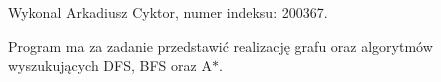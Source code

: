 \-Wykonal \-Arkadiusz \-Cyktor, numer indeksu\-: 200367.

\-Program ma za zadanie przedstawić realizację grafu oraz algorytmów wyszukujących \-D\-F\-S, \-B\-F\-S oraz \-A$\ast$. 